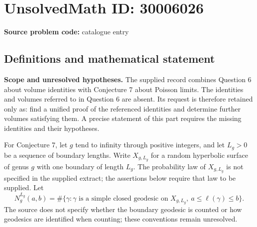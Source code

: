 \documentclass[11pt]{article}
\begin{document}
\section*{UnsolvedMath ID: 30006026}
\textbf{Source problem code:} catalogue entry
\subsection{Definitions and mathematical statement}
\textbf{Scope and unresolved hypotheses.} The supplied record combines Question 6 about volume identities with Conjecture 7 about Poisson limits. The identities and volumes referred to in Question 6 are absent. Its request is therefore retained only as: find a unified proof of the referenced identities and determine further volumes satisfying them. A precise statement of this part requires the missing identities and their hypotheses.

For Conjecture 7, let \(g\) tend to infinity through positive integers, and let \(L_g>0\) be a sequence of boundary lengths. Write \(X_{g,L_g}\) for a random hyperbolic surface of genus \(g\) with one boundary of length \(L_g\). The probability law of \(X_{g,L_g}\) is not specified in the supplied extract; the assertions below require that law to be supplied. Let
\[
N_g^{L_g}(a,b)=\#\{\gamma:\gamma\text{ is a simple closed geodesic on }X_{g,L_g},\ a\leq\ell(\gamma)\leq b\}.
\]
The source does not specify whether the boundary geodesic is counted or how geodesics are identified when counting; these conventions remain unresolved.
\end{document}
